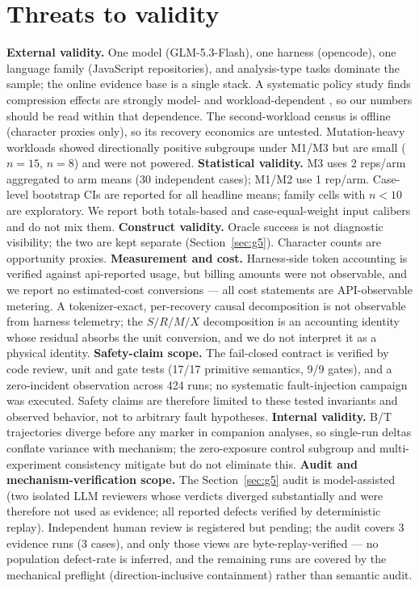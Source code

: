 \documentclass[twocolumn]{svjour3}       %
\begin{document}
\section{Threats to validity}
\label{sec:threats}
\textbf{External validity.} One model (GLM-5.3-Flash), one harness (opencode), one
language family (JavaScript repositories), and analysis-type tasks dominate the sample;
the online evidence base is a single stack. A systematic policy study finds compression
effects are strongly model- and workload-dependent \cite{beyondtokensavings2026}, so our
numbers should be read within that dependence. The second-workload census is offline
(character proxies only), so its recovery economics are untested. Mutation-heavy
workloads showed directionally positive subgroups under M1/M3 but are small ($n{=}15$,
$n{=}8$) and were not powered.
\textbf{Statistical validity.} M3 uses 2 reps/arm aggregated to arm means (30 independent
cases); M1/M2 use 1 rep/arm. Case-level bootstrap CIs are reported for all headline
means; family cells with $n<10$ are exploratory. We report both totals-based and
case-equal-weight input calibers and do not mix them.
\textbf{Construct validity.} Oracle success is not diagnostic visibility; the two are
kept separate (Section~\ref{sec:g5}). Character counts are opportunity proxies.
\textbf{Measurement and cost.} Harness-side token accounting is verified against
api-reported usage, but billing amounts were not observable, and we report no
estimated-cost conversions --- all cost statements are API-observable metering.
A tokenizer-exact, per-recovery causal
decomposition is not observable from harness telemetry; the $S/R/M/X$ decomposition is
an accounting identity whose residual absorbs the unit conversion, and we do not
interpret it as a physical identity.
\textbf{Safety-claim scope.} The fail-closed contract is verified by code review, unit
and gate tests (17/17 primitive semantics, 9/9 gates), and a zero-incident observation
across 424 runs; no systematic fault-injection campaign was executed. Safety claims are
therefore limited to these tested invariants and observed behavior, not to arbitrary
fault hypotheses.
\textbf{Internal validity.} B/T trajectories diverge before any marker in companion
analyses, so single-run deltas conflate variance with mechanism; the zero-exposure
control subgroup and multi-experiment consistency mitigate but do not eliminate this.
\textbf{Audit and mechanism-verification scope.} The Section~\ref{sec:g5} audit is
model-assisted (two isolated LLM reviewers whose verdicts diverged substantially and
were therefore not used as evidence; all reported defects verified by deterministic
replay). Independent human review is registered but pending; the audit covers 3 evidence
runs (3 cases), and only those views are byte-replay-verified --- no population
defect-rate is inferred, and the remaining runs are covered by the mechanical preflight
(direction-inclusive containment) rather than semantic audit.
\end{document}
